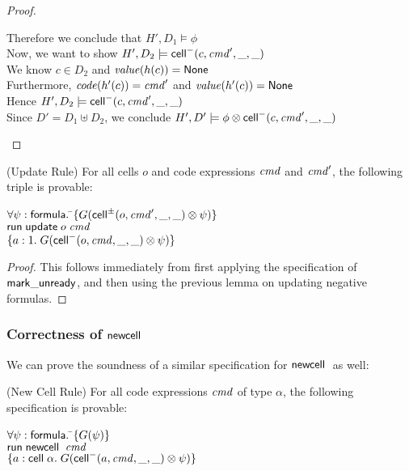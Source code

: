 \begin{proof}
\begin{tabbedproof}
    \ooo Therefore we conclude that $H', D_1 \models \phi$ \\
    \ooo Now, we want to show $H', D_2 \models \mathsf{cell}^{-}({c}, {\mathit{cmd}'}, {\_}, {\_})$ \\
    \oooo We know $c \in D_2$ and $\mathit{value}(h(c)) = \mathsf{None}$ \\
    \oooo Furthermore, $\mathit{code}(h'(c)) = \mathit{cmd}'$ and $\mathit{value}(h'(c)) = \mathsf{None}$ \\
    \oooo Hence $H', D_2 \models \mathsf{cell}^{-}({c}, {\mathit{cmd}'}, {\_}, {\_})$ \\
    \ooo Since $D' = D_1 \uplus D_2$, we conclude $H', D' \models \phi \otimes \mathsf{cell}^{-}({c}, {\mathit{cmd}'}, {\_}, {\_})$ 
  \end{tabbedproof}
\end{proof}

\begin{lemma}{(Update Rule)}
For all cells $o$ and code expressions $\mathit{cmd}$ and $\mathit{cmd}'$, the following
triple is provable: 

\begin{tabbing}
$\forall \psi:\mathsf{formula}.\; $\=$\{{G(\mathsf{cell}^{\pm}({o}, {\mathit{cmd}'}, {\_}, {\_}) \otimes \psi)}\}$ \\
                           \>$\mathsf{run}\;{\mathsf{update}\;o\;\mathit{cmd}}$ \\
                           \>$\{{a:1.\; G(\mathsf{cell}^{-}({o}, {\mathit{cmd}}, {\_}, {\_}) \otimes \psi)}\}$
\end{tabbing}
\end{lemma}

\begin{proof}
This follows immediately from first applying the specification of $\mathsf{mark\_unready}$, 
and then using the previous lemma on updating negative formulas. 
\end{proof}


\subsubsection{Correctness of $\mathsf{newcell}\;$}

We can prove the soundness of a similar specification for $\mathsf{newcell}\;$ as
well:

\begin{prop}{(New Cell Rule)}
For all code expressions $\mathit{cmd}$ of type $\alpha$, the following specification is provable: 
\begin{tabbing}
$\forall \psi:\mathsf{formula}.\; $\=$\{{G(\psi)}\}$ \\
                           \>$\mathsf{run}\;{\mathsf{newcell}\;\;\mathit{cmd}}$ \\
                           \>$\{{a:\mathsf{cell}\;{\alpha}.\; G(\mathsf{cell}^{-}({a}, {\mathit{cmd}}, {\_}, {\_}) \otimes \psi)}\}$
\end{tabbing}
\end{prop}

